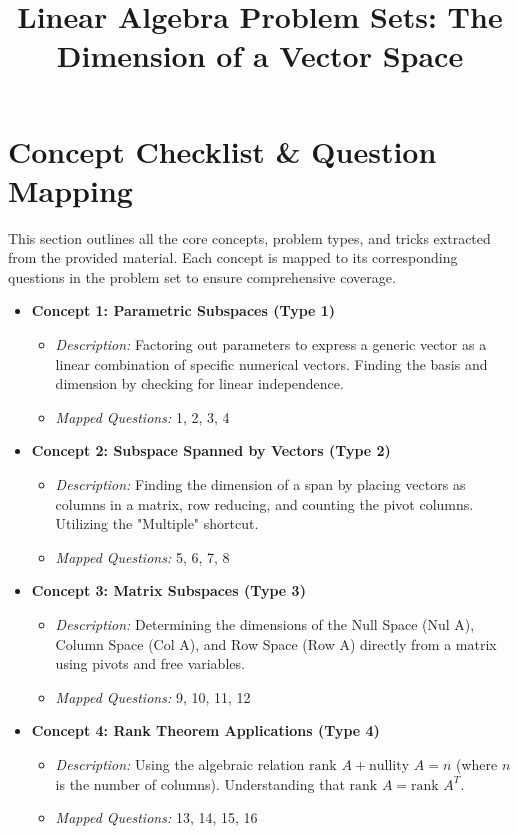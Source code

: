 \documentclass{article}
\title{Linear Algebra Problem Sets: The Dimension of a Vector Space}
\author{}
\date{}
\begin{document}
\maketitle
\tableofcontents
\newpage

\section{Concept Checklist \& Question Mapping}
This section outlines all the core concepts, problem types, and tricks extracted from the provided material. Each concept is mapped to its corresponding questions in the problem set to ensure comprehensive coverage.

\begin{itemize}
    \item \textbf{Concept 1: Parametric Subspaces (Type 1)} 
    \begin{itemize}
        \item \textit{Description:} Factoring out parameters to express a generic vector as a linear combination of specific numerical vectors. Finding the basis and dimension by checking for linear independence.
        \item \textit{Mapped Questions:} 1, 2, 3, 4
    \end{itemize}
    
    \item \textbf{Concept 2: Subspace Spanned by Vectors (Type 2)}
    \begin{itemize}
        \item \textit{Description:} Finding the dimension of a span by placing vectors as columns in a matrix, row reducing, and counting the pivot columns. Utilizing the "Multiple" shortcut.
        \item \textit{Mapped Questions:} 5, 6, 7, 8
    \end{itemize}

    \item \textbf{Concept 3: Matrix Subspaces (Type 3)}
    \begin{itemize}
        \item \textit{Description:} Determining the dimensions of the Null Space (Nul A), Column Space (Col A), and Row Space (Row A) directly from a matrix using pivots and free variables.
        \item \textit{Mapped Questions:} 9, 10, 11, 12
    \end{itemize}

    \item \textbf{Concept 4: Rank Theorem Applications (Type 4)}
    \begin{itemize}
        \item \textit{Description:} Using the algebraic relation $\text{rank } A + \text{nullity } A = n$ (where $n$ is the number of columns). Understanding that $\text{rank } A = \text{rank } A^T$.
        \item \textit{Mapped Questions:} 13, 14, 15, 16
    \end{itemize}


\end{itemize}
\end{document}
